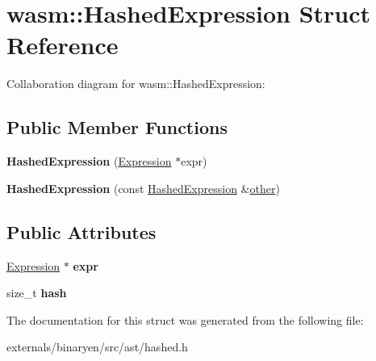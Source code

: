 \hypertarget{structwasm_1_1_hashed_expression}{}\section{wasm\+:\+:Hashed\+Expression Struct Reference}
\label{structwasm_1_1_hashed_expression}


Collaboration diagram for wasm\+:\+:Hashed\+Expression\+:
\subsection*{Public Member Functions}
\begin{DoxyCompactItemize}
\item 
\mbox{\label{structwasm_1_1_hashed_expression_a8deaf6f3e684d9f2c892a4c126318fc0}} 
{\bfseries Hashed\+Expression} (\mbox{\hyperlink{classwasm_1_1_expression}{Expression}} $\ast$expr)
\item 
\mbox{\label{structwasm_1_1_hashed_expression_af7558f5588f27acfd25834630081f633}} 
{\bfseries Hashed\+Expression} (const \mbox{\hyperlink{structwasm_1_1_hashed_expression}{Hashed\+Expression}} \&\mbox{\hyperlink{structother}{other}})
\end{DoxyCompactItemize}
\subsection*{Public Attributes}
\begin{DoxyCompactItemize}
\item 
\mbox{\label{structwasm_1_1_hashed_expression_a63d18f92abe72d51ddc9b23e9c5bed4a}} 
\mbox{\hyperlink{classwasm_1_1_expression}{Expression}} $\ast$ {\bfseries expr}
\item 
\mbox{\label{structwasm_1_1_hashed_expression_a78925e432d67223bdcb1dd4544c8414d}} 
size\+\_\+t {\bfseries hash}
\end{DoxyCompactItemize}


The documentation for this struct was generated from the following file\+:\begin{DoxyCompactItemize}
\item 
externals/binaryen/src/ast/hashed.\+h\end{DoxyCompactItemize}
